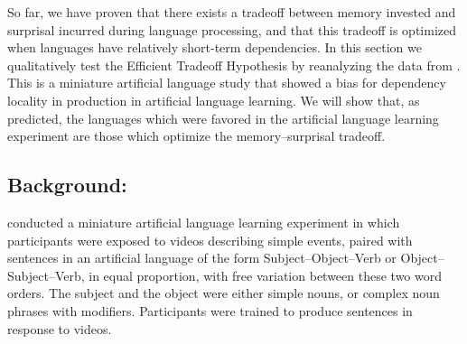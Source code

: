 \label{sec:toy-study}
So far, we have proven that there exists a tradeoff between memory invested and surprisal incurred during language processing, and that this tradeoff is optimized when languages have relatively short-term dependencies. In this section we qualitatively test the Efficient Tradeoff Hypothesis by reanalyzing the data from \cite{fedzechkina-human-2017}.
This is a miniature artificial language study that showed a bias for dependency locality in production in artificial language learning. 
We will show that, as predicted, the languages which were favored in the artificial language learning experiment are those which optimize the memory--surprisal tradeoff. 

\subsection{Background: \citet{fedzechkina-human-2017}}

\citet{fedzechkina-human-2017} conducted a miniature artificial language learning experiment in which participants were exposed to videos describing simple events, paired with sentences in an artificial language of the form Subject--Object--Verb or Object--Subject--Verb, in equal proportion, with free variation between these two word orders. The subject and the object were either simple nouns, or complex noun phrases with modifiers. Participants were trained to produce sentences in response to videos.


